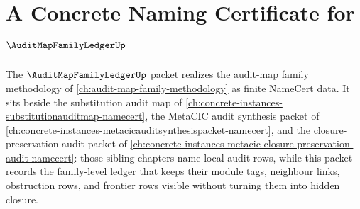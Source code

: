 \chapter{A Concrete Naming Certificate for $\AuditMapFamilyLedgerUp$}
\label{ch:concrete-instances-auditmapfamilyledger-namecert}

The $\AuditMapFamilyLedgerUp$ packet realizes the audit-map family methodology of \autoref{ch:audit-map-family-methodology} as finite NameCert data. It sits beside the substitution audit map of \autoref{ch:concrete-instances-substitutionauditmap-namecert}, the MetaCIC audit synthesis packet of \autoref{ch:concrete-instances-metacicauditsynthesispacket-namecert}, and the closure-preservation audit packet of \autoref{ch:concrete-instances-metacic-closure-preservation-audit-namecert}: those sibling chapters name local audit rows, while this packet records the family-level ledger that keeps their module tags, neighbour links, obstruction rows, and frontier rows visible without turning them into hidden closure.

